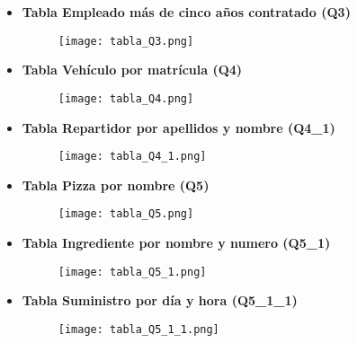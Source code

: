 \documentclass[a4paper]{article}
\begin{document}
\begin{itemize}
    \item \textbf{\large{Tabla Empleado más de cinco años contratado (Q3)}}

    \begin{figure}[H]
        \centering
        \texttt{[image: tabla\_Q3.png]}
        \label{fig:tabla_Q3}
    \end{figure}

    \item \textbf{\large{Tabla Vehículo por matrícula (Q4)}}

    \begin{figure}[H]
        \centering
        \texttt{[image: tabla\_Q4.png]}
        \label{fig:tabla_Q4}
    \end{figure}

    \item \textbf{\large{Tabla Repartidor por apellidos y nombre (Q4\_1)}}

    \begin{figure}[H]
        \centering
        \texttt{[image: tabla\_Q4\_1.png]}
        \label{fig:tabla_Q4_1}
    \end{figure}

    \item \textbf{\large{Tabla Pizza por nombre (Q5)}}

    \begin{figure}[H]
        \centering
        \texttt{[image: tabla\_Q5.png]}
        \label{fig:tabla_Q5}
    \end{figure}

    \item \textbf{\large{Tabla Ingrediente por nombre y numero (Q5\_1)}}

    \begin{figure}[H]
        \centering
        \texttt{[image: tabla\_Q5\_1.png]}
        \label{fig:tabla_Q5_1}
    \end{figure}

\newpage

    \item \textbf{\large{Tabla Suministro por día y hora (Q5\_1\_1)}}

    \begin{figure}[H]
        \centering
        \texttt{[image: tabla\_Q5\_1\_1.png]}
        \label{fig:tabla_Q5_1_1}
    \end{figure}
        
\end{itemize}
\end{document}
